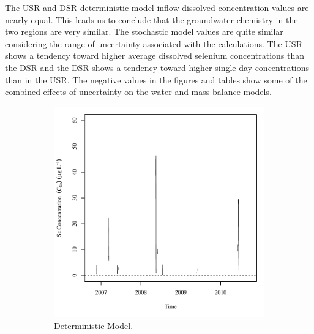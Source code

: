 \begin{linenumbers}
The USR and DSR deterministic model inflow dissolved concentration values are nearly equal.  This leads us to conclude that the groundwater chemistry in the two regions are very similar.  The stochastic model values are quite similar considering the range of uncertainty associated with the calculations.  The USR shows a tendency toward higher average dissolved selenium concentrations than the DSR and the DSR shows a tendency toward higher single day concentrations than in the USR.  The negative values in the figures and tables show some of the combined effects of uncertainty on the water and mass balance models.
\clearpage

\begin{figure}[htbp]
\centering
	\begin{subfigure}{0.5\textwidth}
		\centering
		\includegraphics[width=0.9\linewidth]{"Figures/Results_DUSR/Balance Cout"}
		\caption{Deterministic Model.}
	\end{subfigure}%
	\begin{subfigure}{0.5\textwidth}
		\centering

\end{subfigure}
\end{figure}
\end{linenumbers}
